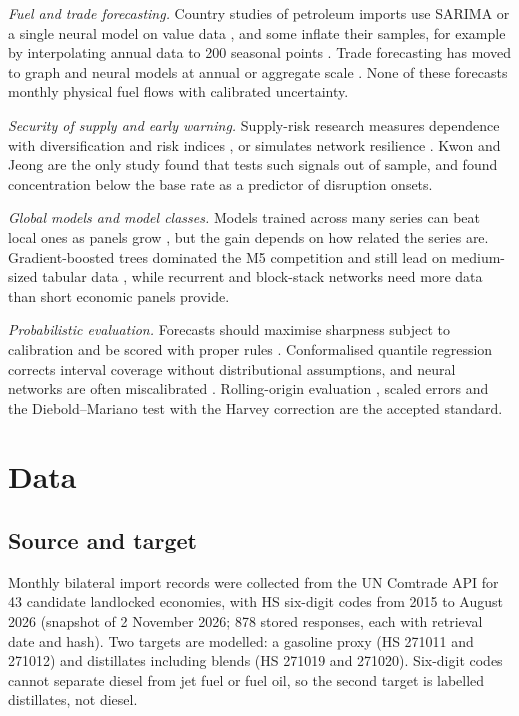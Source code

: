 \documentclass[conference]{IEEEtran}
\begin{document}
\textit{Fuel and trade forecasting.} Country studies of petroleum imports use SARIMA or a single neural model on value data \cite{santi2023,pradhan2023}, and some inflate their samples, for example by interpolating annual data to 200 seasonal points \cite{khajoui2024}. Trade forecasting has moved to graph and neural models at annual or aggregate scale \cite{zhao2026,sellami2024,ma2024}. None of these forecasts monthly physical fuel flows with calibrated uncertainty.

\textit{Security of supply and early warning.} Supply-risk research measures dependence with diversification and risk indices \cite{cohen2011,lecoq2009,ang2015}, or simulates network resilience \cite{chen2025}. Kwon and Jeong \cite{kwon2026} are the only study found that tests such signals out of sample, and found concentration below the base rate as a predictor of disruption onsets.

\textit{Global models and model classes.} Models trained across many series can beat local ones as panels grow \cite{montero2021,semenoglou2021,hewamalage2022}, but the gain depends on how related the series are. Gradient-boosted trees \cite{ke2017,chen2016} dominated the M5 competition \cite{makridakis2022} and still lead on medium-sized tabular data \cite{grinsztajn2022}, while recurrent \cite{hochreiter1997,cho2014,hewamalage2021} and block-stack networks \cite{oreshkin2019} need more data than short economic panels provide.

\textit{Probabilistic evaluation.} Forecasts should maximise sharpness subject to calibration and be scored with proper rules \cite{gneiting2007}. Conformalised quantile regression \cite{romano2019} corrects interval coverage without distributional assumptions, and neural networks are often miscalibrated \cite{guo2017}. Rolling-origin evaluation \cite{tashman2000,bergmeir2018}, scaled errors \cite{hyndman2006} and the Diebold--Mariano test with the Harvey correction \cite{diebold1995,harvey1997} are the accepted standard.

\section{Data}\label{sec:data}

\subsection{Source and target}
Monthly bilateral import records were collected from the UN Comtrade API \cite{comtrade} for 43 candidate landlocked economies, with HS six-digit codes from 2015 to August 2026 (snapshot of 2 November 2026; 878 stored responses, each with retrieval date and hash). Two targets are modelled: a gasoline proxy (HS 271011 and 271012) and distillates including blends (HS 271019 and 271020). Six-digit codes cannot separate diesel from jet fuel or fuel oil, so the second target is labelled distillates, not diesel.
\end{document}
